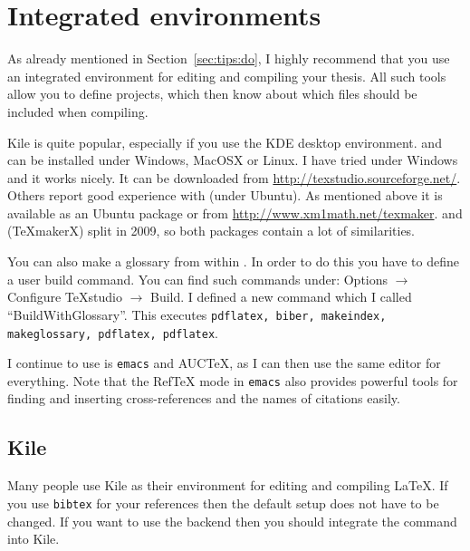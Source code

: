 \section{Integrated environments}
\label{sec:app:compile}

As already mentioned in Section~\ref{sec:tips:do}, I highly recommend
that you use an integrated environment for editing and compiling your
thesis. All such tools allow you to define projects, which then know
about which files should be included when compiling.

Kile is quite popular, especially if you use the KDE
desktop environment. \TeXstudio{} and
\TeXmaker{} can be installed under Windows, MacOSX or
Linux. I have tried \TeXstudio under Windows and it works nicely. It
can be downloaded from \url{http://texstudio.sourceforge.net/}. Others
report good experience with \TeXmaker (under Ubuntu). As mentioned
above it is available as an Ubuntu package or from
\url{http://www.xm1math.net/texmaker}.
\TeXmaker and \TeXstudio (\TeX makerX) split in 2009, so both packages
contain a lot of similarities.

You can also make a glossary from within \TeXstudio. In order to do
this you have to define a user build command. You can find such commands
under:  \textsf{Options} $\to$ \textsf{Configure TeXstudio} $\to$
\textsf{Build}. I defined a new command which I called
\enquote{BuildWithGlossary}. This executes \texttt{pdflatex, biber,
  makeindex, makeglossary, pdflatex, pdflatex}.

I continue to use is \texttt{emacs} and AUCTeX, as I can
then use the same editor for everything. Note that the
RefTeX mode in \texttt{emacs} also provides powerful
tools for finding and inserting cross-references and the names of
citations easily.


\subsection{Kile}
\label{sec:app:kubuntu:kile}

Many people use Kile as their environment for editing and compiling
\LaTeX. If you use \texttt{bibtex} for your references then the default
setup does not have to be changed. If you want to use the
 backend then you should integrate the
command into Kile.

